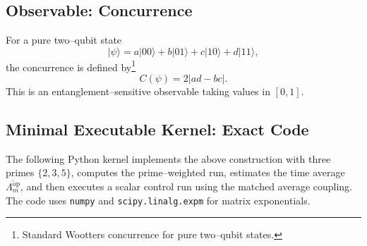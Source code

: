 \documentclass[11pt]{article}
\begin{document}
\subsection{Observable: Concurrence}

For a pure two–qubit state
\[
  |\psi\rangle = a|00\rangle + b|01\rangle + c|10\rangle + d|11\rangle,
\]
the concurrence is defined by\footnote{Standard Wootters concurrence for pure two–qubit states.}
\begin{equation}
  C(\psi) = 2|ad - bc|.
\end{equation}
This is an entanglement–sensitive observable taking values in \([0,1]\).

\subsection{Minimal Executable Kernel: Exact Code}

The following Python kernel implements the above construction with three primes \(\{2,3,5\}\), computes the prime–weighted run, estimates the time average \(\overline{\Lambda_m^{\mathrm{op}}}\), and then executes a scalar control run using the matched average coupling. The code uses \texttt{numpy} and \texttt{scipy.linalg.expm} for matrix exponentials.
\end{document}
